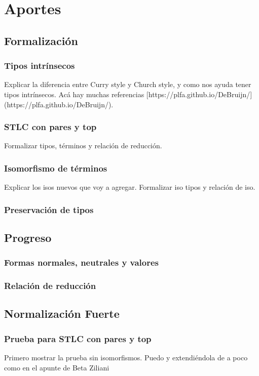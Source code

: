 \documentclass[]{report}
\begin{document}
	
	\chapter{Aportes}
	\section{Formalización}
	\subsection{Tipos intrínsecos}
	Explicar la diferencia entre Curry style y Church style, y como nos ayuda tener tipos intrínsecos. Acá hay muchas referencias
	[https://plfa.github.io/DeBruijn/] (https://plfa.github.io/DeBruijn/).
	\subsection{STLC con pares y top}
	Formalizar tipos, términos y relación de reducción.
	\subsection{Isomorfismo de términos}
	Explicar los isos nuevos que voy a agregar. Formalizar iso tipos y relación de iso.
	
	\subsection{Preservación de tipos}
	
	\section{Progreso}
	
	\subsection{Formas normales, neutrales y valores}
	\subsection{Relación de reducción}
	
	\section{Normalización Fuerte}
	
	\subsection{Prueba para STLC con pares y top}
	Primero mostrar la prueba sin isomorfismos. Puedo y extendiéndola de a poco como en el apunte de Beta Ziliani
\end{document}
